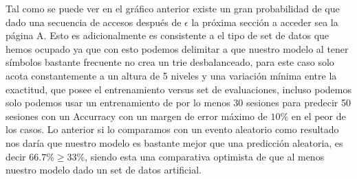 	Tal como se puede ver en el gráfico anterior existe un gran probabilidad de que dado una secuencia de accesos después de $\epsilon$ la próxima sección a acceder sea la página A.
	Esto es adicionalmente es consistente a el tipo de set de datos que hemos ocupado ya que con esto podemos delimitar a que nuestro modelo al tener símbolos bastante frecuente no crea un trie desbalanceado, para este caso solo acota constantemente a un altura de 5 niveles y una variación mínima entre la exactitud, que posee el entrenamiento versus set de evaluaciones, incluso podemos solo podemos usar un entrenamiento de por lo menos 30 sesiones para predecir 50 sesiones con un Accurracy con un margen de error máximo de $10\%$ en el peor de los casos. 
	Lo anterior si lo comparamos con un evento aleatorio como resultado nos daría que nuestro modelo es bastante mejor que una predicción aleatoria, es decir $ 66.7\%  \geq 33\%$, siendo esta una comparativa optimista de que al menos nuestro modelo dado un set de datos artificial.
	
	